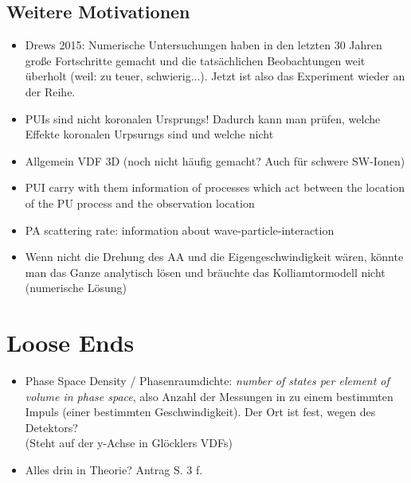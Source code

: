 \documentclass[]{article}
\begin{document}
\subsection{Weitere Motivationen}
\begin{itemize}
	\item Drews 2015: Numerische Untersuchungen haben in den letzten 30 Jahren große Fortschritte gemacht und die tatsächlichen Beobachtungen weit überholt (weil: zu teuer, schwierig...). Jetzt ist also das Experiment wieder an der Reihe. 
	\item PUIs sind nicht koronalen Ursprungs! Dadurch kann man prüfen, welche Effekte koronalen Urpsurngs sind und welche nicht
	\item Allgemein VDF 3D (noch nicht häufig gemacht? Auch für schwere SW-Ionen)
	\item PUI carry with them information of processes which act between the location of the PU process and the observation location
	\item PA scattering rate: information about wave-particle-interaction 
	\item Wenn nicht die Drehung des AA und die Eigengeschwindigkeit wären, könnte man das Ganze analytisch lösen und bräuchte das Kolliamtormodell nicht (numerische Lösung)
\end{itemize}
%
%
%
\newpage
\section{Loose Ends}
\begin{itemize}
	\item Phase Space Density / Phasenraumdichte: \textit{number of states per element of volume in phase space}, also Anzahl der Messungen in zu einem bestimmten Impuls (einer bestimmten Geschwindigkeit). Der Ort ist fest, wegen des Detektors?\\
	(Steht auf der y-Achse in Glöcklers VDFs)
	\item Alles drin in Theorie? Antrag S. 3 f.
\end{itemize}
%
%
%
\newpage
\end{document}
